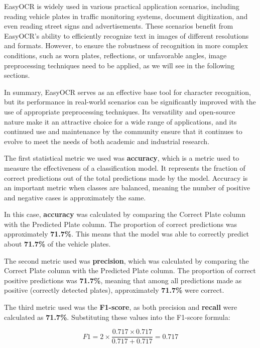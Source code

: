\documentclass[conference]{IEEEtran}
\begin{document}
    EasyOCR is widely used in various practical application scenarios, including reading vehicle plates in traffic monitoring systems, document digitization, and even reading street signs and advertisements. These scenarios benefit from EasyOCR's ability to efficiently recognize text in images of different resolutions and formats. However, to ensure the robustness of recognition in more complex conditions, such as worn plates, reflections, or unfavorable angles, image preprocessing techniques need to be applied, as we will see in the following sections.
    
    In summary, EasyOCR serves as an effective base tool for character recognition, but its performance in real-world scenarios can be significantly improved with the use of appropriate preprocessing techniques. Its versatility and open-source nature make it an attractive choice for a wide range of applications, and its continued use and maintenance by the community ensure that it continues to evolve to meet the needs of both academic and industrial research.
    
    The first statistical metric we used was \textbf{accuracy}, which is a metric used to measure the effectiveness of a classification model. It represents the fraction of correct predictions out of the total predictions made by the model. Accuracy is an important metric when classes are balanced, meaning the number of positive and negative cases is approximately the same.
    
    In this case, \textbf{accuracy} was calculated by comparing the Correct Plate column with the Predicted Plate column. The proportion of correct predictions was approximately \textbf{71.7\%}. This means that the model was able to correctly predict about \textbf{71.7\%} of the vehicle plates.
    
    The second metric used was \textbf{precision}, which was calculated by comparing the Correct Plate column with the Predicted Plate column. The proportion of correct positive predictions was \textbf{71.7\%}, meaning that among all predictions made as positive (correctly detected plates), approximately \textbf{71.7\%} were correct.
    
    The third metric used was the \textbf{F1-score}, as both precision and \textbf{recall} were calculated as \textbf{71.7\%}. Substituting these values into the F1-score formula:
    
    \[
    F1 = 2 \times \frac{0.717 \times 0.717}{0.717 + 0.717} = 0.717
    \]
    
\end{document}
